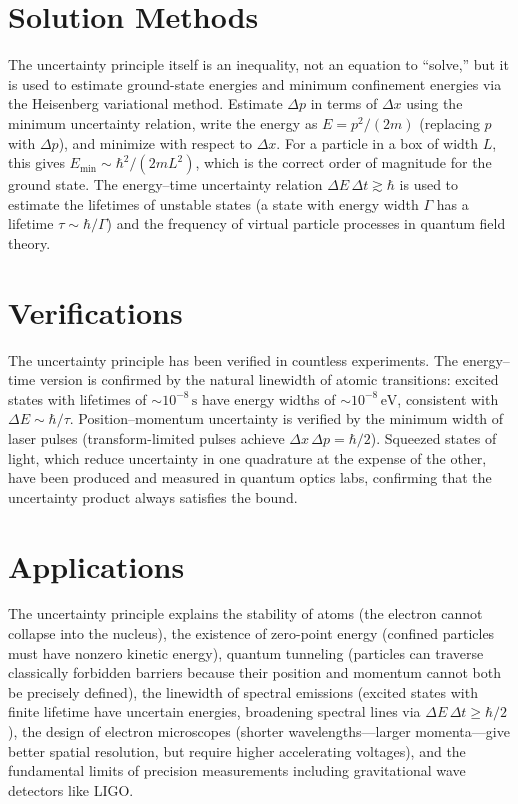 \section*{Solution Methods}

The uncertainty principle itself is an inequality, not an equation to ``solve,'' but it is used to estimate ground-state energies and minimum confinement energies via the Heisenberg variational method. Estimate $\Delta p$ in terms of $\Delta x$ using the minimum uncertainty relation, write the energy as $E = p^2/(2m)$ (replacing $p$ with $\Delta p$), and minimize with respect to $\Delta x$. For a particle in a box of width $L$, this gives $E_{\text{min}} \sim \hbar^2/(2mL^2)$, which is the correct order of magnitude for the ground state. The energy--time uncertainty relation $\Delta E\,\Delta t \gtrsim \hbar$ is used to estimate the lifetimes of unstable states (a state with energy width $\Gamma$ has a lifetime $\tau \sim \hbar/\Gamma$) and the frequency of virtual particle processes in quantum field theory.
\section*{Verifications}

The uncertainty principle has been verified in countless experiments. The energy--time version is confirmed by the natural linewidth of atomic transitions: excited states with lifetimes of $\sim 10^{-8}\,\text{s}$ have energy widths of $\sim 10^{-8}\,\text{eV}$, consistent with $\Delta E \sim \hbar/\tau$. Position--momentum uncertainty is verified by the minimum width of laser pulses (transform-limited pulses achieve $\Delta x\,\Delta p = \hbar/2$). Squeezed states of light, which reduce uncertainty in one quadrature at the expense of the other, have been produced and measured in quantum optics labs, confirming that the uncertainty product always satisfies the bound.
\section*{Applications}

The uncertainty principle explains the stability of atoms (the electron cannot collapse into the nucleus), the existence of zero-point energy (confined particles must have nonzero kinetic energy), quantum tunneling (particles can traverse classically forbidden barriers because their position and momentum cannot both be precisely defined), the linewidth of spectral emissions (excited states with finite lifetime have uncertain energies, broadening spectral lines via $\Delta E\,\Delta t \geq \hbar/2$), the design of electron microscopes (shorter wavelengths---larger momenta---give better spatial resolution, but require higher accelerating voltages), and the fundamental limits of precision measurements including gravitational wave detectors like LIGO.
